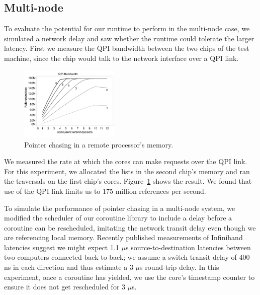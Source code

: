 \documentclass[10pt,nocopyrightspace,preprint]{sigplanconf}
\begin{document}
{\subsection{Multi-node}

To evaluate the potential for our runtime to perform in the multi-node case, we simulated a network delay and saw whether the runtime could tolerate the larger latency. First we measure the QPI bandwidth between the two chips of the test machine, since the chip would talk to the network interface over a QPI link.

\begin{figure}[h]
  \begin{center}
    \includegraphics[width=0.42\textwidth]{figures/qpi_bw-edited.pdf}
  \end{center}
  \caption{Pointer chasing in a remote processor's memory.}
  \label{fig:listwalk-qpi}
\end{figure}

We measured the rate at which the cores can make requests
over the QPI link. For this experiment, we allocated the lists in the
second chip's memory and ran the traversals on the first chip's cores. Figure~\ref{fig:listwalk-qpi} shows the result. We found that use of the QPI link limits us to 175 million references per second.


To simulate the performance of pointer chasing in a
multi-node system, we modified the scheduler of our coroutine library
to include a delay before a coroutine can be rescheduled, imitating
the network transit delay even though we are referencing local
memory. Recently published measurements of Infiniband latencies
 suggest we might expect 1.1 $\mu$s source-to-destination
latencies between two computers connected back-to-back; we assume a
switch transit delay of 400 ns  in each direction and thus estimate a 3
$\mu$s round-trip delay. In this experiment, once a coroutine has
yielded, we use the core's timestamp counter to ensure it does not get
rescheduled for 3 $\mu$s.

}
\end{document}
